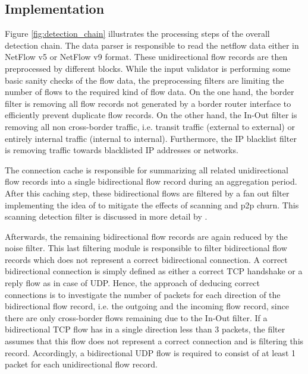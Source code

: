 \subsection{Implementation}
Figure \ref{fig:detection_chain} illustrates the processing steps of the 
overall detection chain. The data parser is responsible to read the netflow data 
either in NetFlow v5 or NetFlow v9 format. These unidirectional flow records are 
then preprocessed by different blocks. While the input validator is performing 
some basic sanity checks of the flow data, the preprocessing filters are 
limiting the number of flows to the required kind of flow data. On the one hand, 
the border filter is removing all flow records not generated by a border router 
interface to efficiently prevent duplicate flow records. On the other hand, the 
In-Out filter is removing all non cross-border traffic, i.e. transit traffic 
(external to external) or entirely internal traffic (internal to internal). 
Furthermore, the IP blacklist filter is removing traffic towards blacklisted IP 
addresses or networks.

The connection cache is responsible for summarizing all related unidirectional 
flow records into a single bidirectional flow record during an aggregation 
period. After this caching step, these bidirectional flows are filtered by a fan 
out filter implementing the idea of \citet{Allman:2007} to mitigate the effects 
of scanning and p2p churn. This scanning detection filter is discussed in more 
detail by \citet{Schatzmann:Mining,Schatzmann:Dissection, Schatzmann:Tracing}. 

Afterwards, the remaining bidirectional flow records are again reduced by the 
noise filter. This last filtering module is responsible to filter bidirectional 
flow records which does not represent a correct bidirectional connection. A 
correct bidirectional connection is simply defined as either a correct TCP 
handshake or a reply flow as in case of UDP. Hence, the approach of deducing 
correct connections is to investigate the number of packets for each direction 
of the bidirectional flow record, i.e. the outgoing and the incoming flow 
record, since there are only cross-border flows remaining due to the In-Out 
filter. If a bidirectional TCP flow has in a single direction less than 3 
packets, the filter assumes that this flow does not represent a correct 
connection and is filtering this record. Accordingly, a bidirectional UDP 
flow is required to consist of at least 1 packet for each unidirectional flow 
record.

